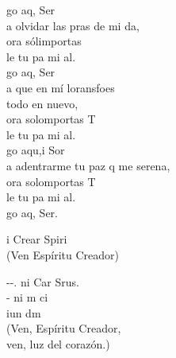 \documentclass[12pt]{article}
\begin{document}
\begin{multicols*}{2}
\begin{cancion}%
	go aq,  Ser \\
	a olvidar las pras de mi da,\\
	ora sólimportas \\
	le tu pa mi al.\\
	go aq,  Ser \\
	a que en mí loransfoes \\
todo en nuevo,\\
	ora solomportas T\\
	le tu pa mi al.\\
	go aqu,i Sor\\
	a adentrarme  tu paz q me serena,\\
	ora solomportas T\\
	le tu pa mi al.\\
	go aq,  Ser. \\
\end{cancion}%

\begin{cancion}%
	i Crear Spiri \\
(Ven Espíritu Creador)\\
\end{cancion}%

\begin{cancion}%
	--. ni Car Srus.\\
	 - ni m ci\\
	iun dm\\
(Ven, Espíritu Creador,\\
 ven, luz del corazón.)\\
\end{cancion}%


\end{multicols*}
\end{document}
